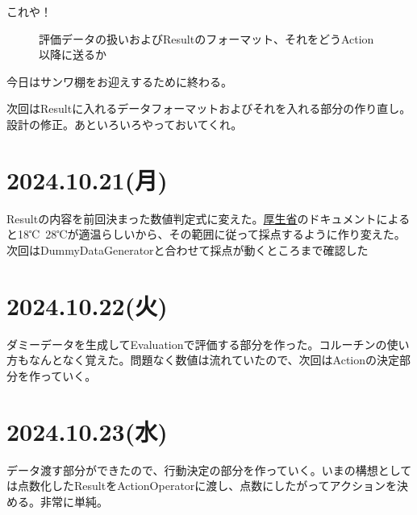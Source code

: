 \documentclass[fleqn,twocolumn]{mynote}
\begin{document}
これや！
\fboxsep=0pt            %
\fboxrule=1pt            %
\begin{figure}[h]
  \centering
  \caption{評価データの扱いおよびResultのフォーマット、それをどうAction以降に送るか}
  \label{fig:EcaluateFormat}
\end{figure}

今日はサンワ棚をお迎えするために終わる。

次回はResultに入れるデータフォーマットおよびそれを入れる部分の作り直し。設計の修正。あといろいろやっておいてくれ。

\section*{2024.10.21(月)}
Resultの内容を前回決まった数値判定式に変えた。\href{https://www.mhlw.go.jp/content/11300000/000905329.pdf}{厚生省}のドキュメントによると18℃~28℃が適温らしいから、その範囲に従って採点するように作り変えた。次回はDummyDataGeneratorと合わせて採点が動くところまで確認した

\section*{2024.10.22(火)}
ダミーデータを生成してEvaluationで評価する部分を作った。コルーチンの使い方もなんとなく覚えた。問題なく数値は流れていたので、次回はActionの決定部分を作っていく。

\section*{2024.10.23(水)}
データ渡す部分ができたので、行動決定の部分を作っていく。いまの構想としては点数化したResultをActionOperatorに渡し、点数にしたがってアクションを決める。非常に単純。
\end{document}
